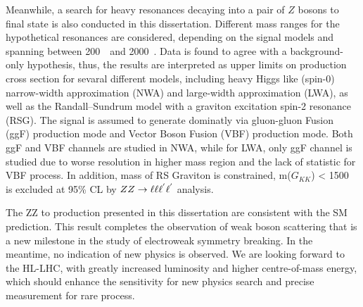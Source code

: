 \begin{enabstract}
Meanwhile, a search for heavy resonances decaying into a pair of $Z$ bosons to \llll final state is also conducted in this dissertation.
Different mass ranges for the hypothetical resonances are considered, depending on the signal models and spanning between 200~\gev~and 2000~\gev.
Data is found to agree with a background-only hypothesis, thus, the results are interpreted as upper limits on production cross section for sevaral different models, 
including heavy Higgs like (spin-0) narrow-width approximation (NWA) and large-width approximation (LWA), as well as the Randall–Sundrum model with a graviton excitation spin-2 resonance (RSG).
The signal is assumed to generate dominatly via gluon-gluon Fusion (ggF) production mode and Vector Boson Fusion (VBF) production mode.
Both ggF and VBF channels are studied in NWA, while for LWA, only ggF channel is studied due to worse resolution in higher mass region and the lack of statistic for VBF process.
In addition, mass of RS Graviton is constrained, m($G_{KK}$) < 1500~\gev~ is excluded at 95\% CL by $ZZ \rightarrow \ell\ell\ell^{'}\ell^{'}$ analysis.

The ZZ to \llll production presented in this dissertation are consistent with the SM prediction. 
This result completes the observation of weak boson scattering that is a new milestone in the study of electroweak symmetry breaking. 
In the meantime, no indication of new physics is observed. 
We are looking forward to the HL-LHC, with greatly increased luminosity and higher centre-of-mass energy, which should enhance the sensitivity for new physics search and precise measurement for rare process.
\end{enabstract}
